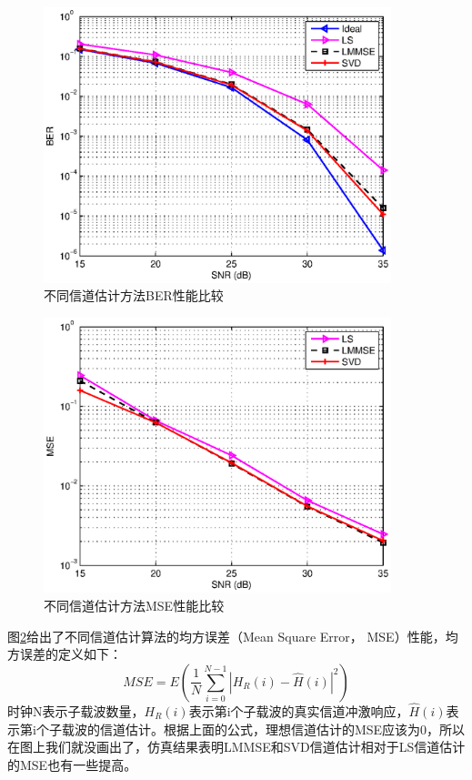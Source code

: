 \begin{figure}[htbp]
\centering
\includegraphics[width=0.9\textwidth]{figures/chapter-3/BER_SNR_avg.eps}
\caption{不同信道估计方法BER性能比较}
\label{fig:BER_SNR_avg}
\end{figure}

\begin{figure}[htbp]
\centering
\includegraphics[width=0.9\textwidth]{figures/chapter-3/MSE_SNR_avg.eps}
\caption{不同信道估计方法MSE性能比较}
\label{fig:MSE_SNR_avg}
\end{figure}
图\ref{fig:MSE_SNR_avg}给出了不同信道估计算法的均方误差（Mean Square Error， MSE）性能，均方误差的定义如下：
\begin{equation}
MSE = E\left(\frac{1}{N}\sum_{i=0}^{N-1}|H_R(i)-\hat{H}(i)|^2\right)
\end{equation}
时钟N表示子载波数量，$H_R(i)$表示第i个子载波的真实信道冲激响应，$\hat{H}(i)$表示第i个子载波的信道估计。根据上面的公式，理想信道估计的MSE应该为0，所以在图上我们就没画出了，仿真结果表明LMMSE和SVD信道估计相对于LS信道估计的MSE也有一些提高。

